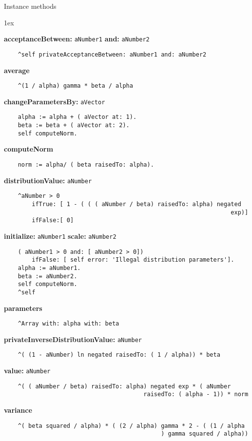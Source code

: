 Instance methods
{\parskip 1ex\par\noindent}
{\bf acceptanceBetween:} {\tt aNumber1} {\bf and:} {\tt aNumber2}
\begin{verbatim}
    ^self privateAcceptanceBetween: aNumber1 and: aNumber2

\end{verbatim}
{\bf average}
\begin{verbatim}
    ^(1 / alpha) gamma * beta / alpha

\end{verbatim}
{\bf changeParametersBy:} {\tt aVector}
\begin{verbatim}
    alpha := alpha + ( aVector at: 1).
    beta := beta + ( aVector at: 2).
    self computeNorm.

\end{verbatim}
{\bf computeNorm}
\begin{verbatim}
    norm := alpha/ ( beta raisedTo: alpha).

\end{verbatim}
{\bf distributionValue:} {\tt aNumber}
\begin{verbatim}
    ^aNumber > 0
        ifTrue: [ 1 - ( ( ( aNumber / beta) raisedTo: alpha) negated 
                                                                 exp)]
        ifFalse:[ 0]

\end{verbatim}
{\bf initialize:} {\tt aNumber1} {\bf scale:} {\tt aNumber2}
\begin{verbatim}
    ( aNumber1 > 0 and: [ aNumber2 > 0])
        ifFalse: [ self error: 'Illegal distribution parameters'].
    alpha := aNumber1.
    beta := aNumber2.
    self computeNorm.
    ^self

\end{verbatim}
{\bf parameters}
\begin{verbatim}
    ^Array with: alpha with: beta

\end{verbatim}
{\bf privateInverseDistributionValue:} {\tt aNumber}
\begin{verbatim}
    ^( (1 - aNumber) ln negated raisedTo: ( 1 / alpha)) * beta

\end{verbatim}
{\bf value:} {\tt aNumber}
\begin{verbatim}
    ^( ( aNumber / beta) raisedTo: alpha) negated exp * ( aNumber 
                                        raisedTo: ( alpha - 1)) * norm

\end{verbatim}
{\bf variance}
\begin{verbatim}
    ^( beta squared / alpha) * ( (2 / alpha) gamma * 2 - ( (1 / alpha 
                                             ) gamma squared / alpha))

\end{verbatim}

